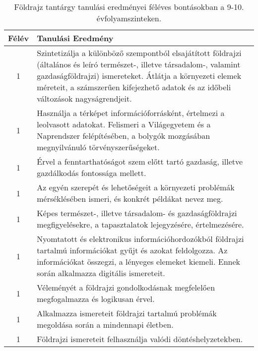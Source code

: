        
           \begin{longtable}{c | p{12cm} }
            \caption[Földrajz 9-10.]{Földrajz tantárgy tanulási eredményei féléves bontásokban a 9-10. évfolyamszinteken. }  \\

            \textbf{Félév} & \textbf{Tanulási Eredmény} \\
            \hline
            \endhead
                                
                                          1 &  Szintetizálja a különböző szempontból elsajátított földrajzi (általános és leíró természet-, illetve társadalom-, valamint gazdaságföldrajzi) ismereteket. Átlátja a környezeti elemek méreteit, a számszerűen kifejezhető adatok és az időbeli változások nagyságrendjeit. \\ \hline
                                          1 &  Használja a térképet információforrásként, értelmezi a leolvasott adatokat. Felismeri a Világegyetem és a Naprendszer felépítésében, a bolygók mozgásában megnyilvánuló törvényszerűségeket. \\ \hline
                                          1 &  Érvel a fenntarthatóságot szem előtt tartó gazdaság, illetve gazdálkodás fontossága mellett. \\ \hline
                                          1 &  Az egyén szerepét és lehetőségeit a környezeti problémák mérséklésében ismeri, és konkrét példákat nevez meg. \\ \hline
                                          1 &  Képes természet-, illetve társadalom- és gazdaságföldrajzi megfigyelésekre, a tapasztalatok lejegyzésére, értelmezésére. \\ \hline
                                          1 &  Nyomtatott és elektronikus információhordozókból földrajzi tartalmú információkat gyűjt és azokat feldolgozza. Az információkat összegzi, a lényeges elemeket kiemeli. Ennek során alkalmazza digitális ismereteit. \\ \hline
                                          1 &  Véleményét a földrajzi gondolkodásnak megfelelően megfogalmazza és logikusan érvel. \\ \hline
                                          1 &  Alkalmazza ismereteit földrajzi tartalmú problémák megoldása során a mindennapi életben. \\ \hline
                                          1 &  Földrajzi ismereteit felhasználja valódi döntéshelyzetekben. \\ \hline
                                      

\end{longtable}
